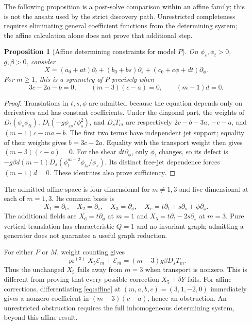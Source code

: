 \documentclass[11pt,a4paper,oneside]{report}
\numberwithin{equation}{chapter}
\newtheorem{proposition}[theorem]{Proposition}
\newcommand{\E}{\mathcal E}
\newcommand{\pr}{\operatorname{pr}}
\begin{document}
The following proposition is a post-solve comparison within an affine family; this is not the ansatz used by the strict discovery path. Unrestricted completeness requires eliminating general coefficient functions from the determining system; the affine calculation alone does not prove that additional step.

\begin{proposition}[Affine determining constraints for model $P$]\label{prop:affine}
On $\phi_s,\phi_t>0$, $g,\beta>0$, consider
\begin{equation}
X=(a_0+at)\partial_t+(b_0+bs)\partial_s
 +(c_0+c\phi+dt)\partial_\phi.
\end{equation}
For $m\ge1$, this is a symmetry of $P$ precisely when
\begin{equation}\label{eq:affine}
3c-2a-b=0,\qquad (m-3)(c-a)=0,\qquad (m-1)d=0.
\end{equation}
\end{proposition}
\begin{proof}
Translations in $t,s,\phi$ are admitted because the equation depends only on derivatives and has constant coefficients. Under the diagonal part, the weights of $D_t(\phi_s\phi_{tt})$, $D_t(-g\phi_{ss}/\phi_s^2)$, and $D_sT_m$ are respectively
$2c-b-3a$, $-c-a$, and $(m-1)c-ma-b$.
The first two terms have independent jet support; equality of their weights gives $b=3c-2a$. Equality with the transport weight then gives $(m-3)(c-a)=0$. For the shear $dt\partial_\phi$, only $\phi_t$ changes, so its defect is
$-g\beta d(m-1)D_s(\phi_t^{m-2}\phi_{ts}/\phi_s)$. Its distinct free-jet dependence forces $(m-1)d=0$. These identities also prove sufficiency.\end{proof}
The admitted affine space is four-dimensional for $m\ne1,3$ and five-dimensional at each of $m=1,3$. Its common basis is
\begin{equation}
X_1=\partial_t,\quad X_2=\partial_s,\quad X_3=\partial_\phi,\quad
X_c=t\partial_t+s\partial_s+\phi\partial_\phi.
\end{equation}
The additional fields are $X_6=t\partial_\phi$ at $m=1$ and $X_5=t\partial_t-2s\partial_s$ at $m=3$. Pure vertical translation has characteristic $Q=1$ and no invariant graph; admitting a generator does not guarantee a useful graph reduction.



For either $P$ or $M$, weight counting gives
\begin{equation}\label{eq:breaking}
\pr^{(3)}X_5\E_m+\E_m=(m-3)g\beta D_sT_m.
\end{equation}
Thus the unchanged $X_5$ fails away from $m=3$ when transport is nonzero. This is different from proving that every possible correction $X_5+\delta Y$ fails. For affine corrections, differentiating \eqref{eq:affine} at $(m,a,b,c)=(3,1,-2,0)$ immediately gives a nonzero coefficient in $(m-3)(c-a)$, hence an obstruction. An unrestricted obstruction requires the full inhomogeneous determining system, beyond this affine result.
\end{document}
